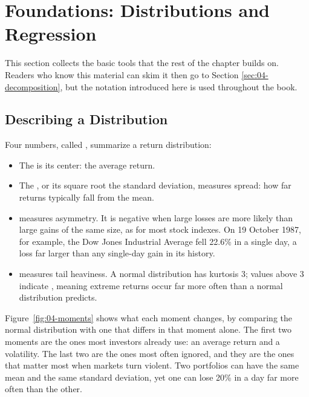 \section{Foundations: Distributions and Regression}
\label{sec:04-foundations}

This section collects the basic tools that the rest of the chapter builds on.
Readers who know this material can skim it then go to Section \ref{sec:04-decomposition}, but the notation introduced here is used throughout the book.

\subsection{Describing a Distribution}
Four numbers, called , summarize a return distribution:
\begin{itemize}
  \item The  is its center: the average return.
  \item The , or its square root the standard deviation, measures spread: how far returns typically fall from the mean.
  \item {} measures asymmetry. It is negative when large losses are more likely than large gains of the same size, as for most stock indexes. On 19 October 1987, for example, the Dow Jones Industrial Average fell 22.6\% in a single day, a loss far larger than any single-day gain in its history.
  \item {} measures tail heaviness. A normal distribution has kurtosis 3; values above 3 indicate , meaning extreme returns occur far more often than a normal distribution predicts.
\end{itemize}

Figure~\ref{fig:04-moments} shows what each moment changes, by comparing the normal distribution with one that differs in that moment alone. The first two moments are the ones most investors already use: an average return and a volatility. The last two are the ones most often ignored, and they are the ones that matter most when markets turn violent. Two portfolios can have the same mean and the same standard deviation, yet one can lose 20\% in a day far more often than the other.


